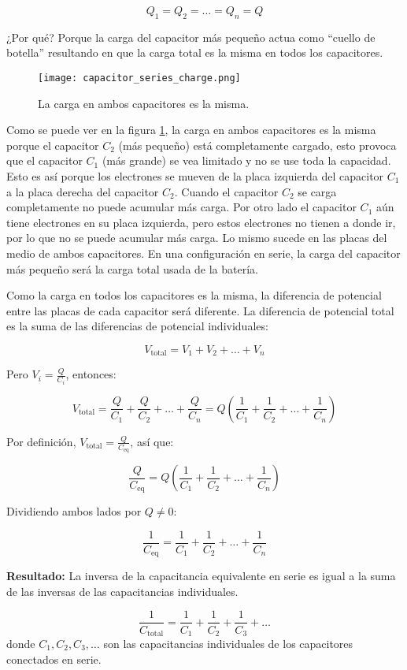 \[
Q_1 = Q_2 = \dots = Q_n = Q
\]

¿Por qué? Porque la carga del capacitor más pequeño actua como ``cuello de botella'' resultando en que la carga total es la misma en todos los capacitores.
\begin{figure}[ht]
    \centering
    \texttt{[image: capacitor\_series\_charge.png]}
    \caption{La carga en ambos capacitores es la misma.}
    \label{fig:capacitors_series_charge}
\end{figure}

Como se puede ver en la figura \ref{fig:capacitors_series_charge}, la carga en ambos capacitores es la misma porque el capacitor \(C_2\) (más pequeño) está completamente cargado, esto provoca que el capacitor \(C_1\) (más grande) se vea limitado y no se use toda la capacidad. Esto es así porque los electrones se mueven de la placa izquierda del capacitor \(C_1\) a la placa derecha del capacitor \(C_2\). Cuando el capacitor \(C_2\) se carga completamente no puede acumular más carga. Por otro lado el capacitor \(C_1\) aún tiene electrones en su placa izquierda, pero estos electrones no tienen a donde ir, por lo que no se puede acumular más carga. Lo mismo sucede en las placas del medio de ambos capacitores. En una configuración en serie, la carga del capacitor más pequeño será la carga total usada de la batería.

Como la carga en todos los capacitores es la misma, la diferencia de potencial entre las placas de cada capacitor será diferente. La diferencia de potencial total es la suma de las diferencias de potencial individuales:

\[
V_{\text{total}} = V_1 + V_2 + \dots + V_n
\]

Pero \( V_i = \frac{Q}{C_i} \), entonces:

\[
V_{\text{total}} = \frac{Q}{C_1} + \frac{Q}{C_2} + \dots + \frac{Q}{C_n} = Q \left( \frac{1}{C_1} + \frac{1}{C_2} + \dots + \frac{1}{C_n} \right)
\]

Por definición, \( V_{\text{total}} = \frac{Q}{C_{\text{eq}}} \), así que:

\[
\frac{Q}{C_{\text{eq}}} = Q \left( \frac{1}{C_1} + \frac{1}{C_2} + \dots + \frac{1}{C_n} \right)
\]

Dividiendo ambos lados por \( Q \neq 0 \):

\[
\frac{1}{C_{\text{eq}}} = \frac{1}{C_1} + \frac{1}{C_2} + \dots + \frac{1}{C_n}
\]

\textbf{Resultado:} La inversa de la capacitancia equivalente en serie es igual a la suma de las inversas de las capacitancias individuales.

\begin{equation}
    \boxed{\frac{1}{C_{\text{total}}} = \frac{1}{C_1} + \frac{1}{C_2} + \frac{1}{C_3} + \ldots}
    \label{eq:capacitance_series}
\end{equation}
donde \( C_1, C_2, C_3, \ldots \) son las capacitancias individuales de los capacitores conectados en serie.